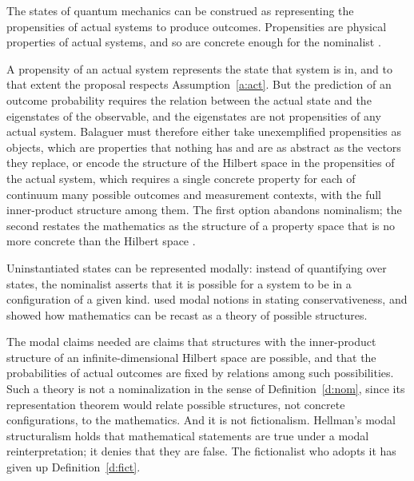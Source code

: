 \documentclass{situationist-preprint}
\begin{document}
\begin{objection}[Propensities]
The states of quantum mechanics can be construed as representing the propensities of actual systems to produce outcomes. Propensities are physical properties of actual systems, and so are concrete enough for the nominalist \citep{Balaguer1996}.
\end{objection}

\begin{reply}
A propensity of an actual system represents the state that system is in, and to that extent the proposal respects Assumption~\ref{a:act}. But the prediction of an outcome probability requires the relation between the actual state and the eigenstates of the observable, and the eigenstates are not propensities of any actual system. Balaguer must therefore either take unexemplified propensities as objects, which are properties that nothing has and are as abstract as the vectors they replace, or encode the structure of the Hilbert space in the propensities of the actual system, which requires a single concrete property for each of continuum many possible outcomes and measurement contexts, with the full inner-product structure among them. The first option abandons nominalism; the second restates the mathematics as the structure of a property space that is no more concrete than the Hilbert space \citep{Bueno2003}.
\end{reply}

\begin{objection}
Uninstantiated states can be represented modally: instead of quantifying over states, the nominalist asserts that it is possible for a system to be in a configuration of a given kind. \citet{Field1989} used modal notions in stating conservativeness, and \citet{Hellman1989} showed how mathematics can be recast as a theory of possible structures.
\end{objection}

\begin{reply}
The modal claims needed are claims that structures with the inner-product structure of an infinite-dimensional Hilbert space are possible, and that the probabilities of actual outcomes are fixed by relations among such possibilities. Such a theory is not a nominalization in the sense of Definition~\ref{d:nom}, since its representation theorem would relate possible structures, not concrete configurations, to the mathematics. And it is not fictionalism. Hellman's modal structuralism holds that mathematical statements are true under a modal reinterpretation; it denies that they are false. The fictionalist who adopts it has given up Definition~\ref{d:fict}.
\end{reply}
\end{document}
